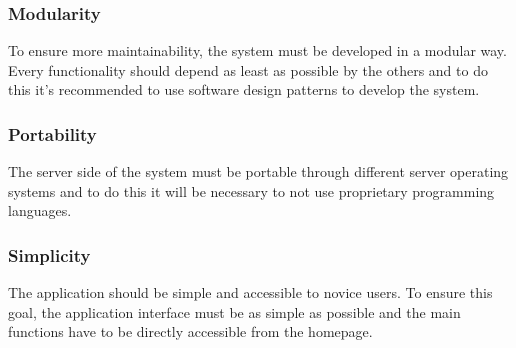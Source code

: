 	\subsubsection{Modularity}
	To ensure more maintainability, the system must be developed in a modular way. Every functionality should depend as least as possible by the others and to do this it's recommended to use software design patterns to develop the system.

	\subsubsection{Portability}
	The server side of the system must be portable through different server operating systems and to do this it will be necessary to not use proprietary programming languages.

	\subsubsection{Simplicity}
	The application should be simple and accessible to novice users. To ensure this goal, the application interface must be as simple as possible and the main functions have to be directly accessible from the homepage.